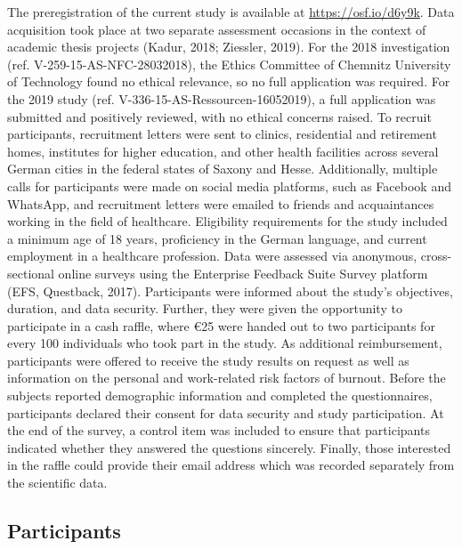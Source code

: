 \documentclass[
  man]{apa6}
\begin{document}
The preregistration of the current study is available at \url{https://osf.io/d6y9k}.
Data acquisition took place at two separate assessment occasions in the context of academic thesis projects (Kadur, 2018; Ziessler, 2019).
For the 2018 investigation (ref. V-259-15-AS-NFC-28032018), the Ethics Committee of Chemnitz University of Technology found no ethical relevance, so no full application was required.
For the 2019 study (ref. V-336-15-AS-Ressourcen-16052019), a full application was submitted and positively reviewed, with no ethical concerns raised.
To recruit participants, recruitment letters were sent to clinics, residential and retirement homes, institutes for higher education, and other health facilities across several German cities in the federal states of Saxony and Hesse.
Additionally, multiple calls for participants were made on social media platforms, such as Facebook and WhatsApp, and recruitment letters were emailed to friends and acquaintances working in the field of healthcare.
Eligibility requirements for the study included a minimum age of 18 years, proficiency in the German language, and current employment in a healthcare profession.
Data were assessed via anonymous, cross-sectional online surveys using the Enterprise Feedback Suite Survey platform (EFS, Questback, 2017).
Participants were informed about the study's objectives, duration, and data security.
Further, they were given the opportunity to participate in a cash raffle, where €25 were handed out to two participants for every 100 individuals who took part in the study.
As additional reimbursement, participants were offered to receive the study results on request as well as information on the personal and work-related risk factors of burnout.
Before the subjects reported demographic information and completed the questionnaires, participants declared their consent for data security and study participation.
At the end of the survey, a control item was included to ensure that participants indicated whether they answered the questions sincerely.
Finally, those interested in the raffle could provide their email address which was recorded separately from the scientific data.

\subsection{Participants}\label{participants}
\end{document}
